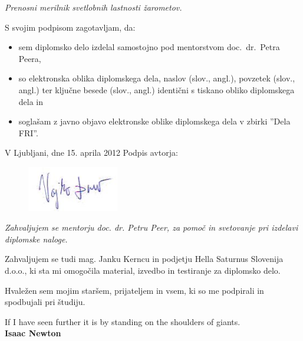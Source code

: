 \documentclass[oneside, a4paper, 12pt]{book}
\newcommand{\clearemptydoublepage}{\newpage{\pagestyle{empty}\cleardoublepage}}
\begin{document}
\vspace{0.5cm}
\emph{Prenosni merilnik svetlobnih lastnosti žarometov.}

\vspace{1.5cm}
\noindent S svojim podpisom zagotavljam, da:
\begin{itemize}
	\item sem diplomsko delo izdelal samostojno pod mentorstvom 
		doc.\ dr.\ Petra Peera,

	\item	so elektronska oblika diplomskega dela, naslov (slov., angl.), 
	povzetek (slov., angl.) ter ključne besede (slov., angl.) identični s 
	tiskano obliko diplomskega dela in
	\item soglašam z javno objavo elektronske oblike diplomskega dela 
	v zbirki ''Dela FRI''.
\end{itemize}

\vspace{1cm}
\noindent V Ljubljani, dne 15. aprila 2012 \hfill Podpis avtorja:
\begin{figure}[h]
\hfill\includegraphics[keepaspectratio=true,width=4cm]{slike/podpis.JPG}
\end{figure}


\clearemptydoublepage

\thispagestyle{empty}\mbox{}\vfill\null\it%
Zahvaljujem se mentorju doc. dr. Petru Peer, za pomoč in svetovanje pri 
izdelavi diplomske naloge.

Zahvaljujem se tudi mag. Janku Kerncu in podjetju Hella Saturnus 
Slovenija d.o.o., ki sta mi omogočila material, izvedbo in testiranje 
za diplomsko delo.

Hvaležen sem mojim staršem, prijateljem in vsem, ki so me podpirali in 
spodbujali pri študiju.
\rm\normalfont

\clearemptydoublepage

\thispagestyle{empty}\mbox{}{\textheight}\mbox{}\hfill\begin{minipage}{0.90\textwidth}%
\begin{flushright}
If I have seen further it is by standing on the shoulders of giants.\\
\textbf{Isaac Newton}
\end{flushright}
\normalfont\end{minipage}
 
\end{document}
